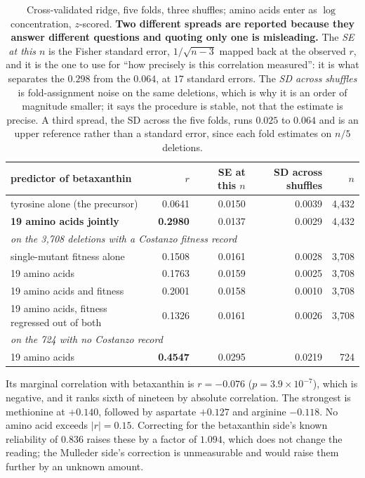 \begin{table}[htbp]
\centering\small
\begin{tabular}{lrrrr}
\toprule
predictor of betaxanthin & $r$ & SE at this $n$ & SD across shuffles & $n$ \\
\midrule
tyrosine alone (the precursor)         & 0.0641 & 0.0150 & 0.0039 & 4{,}432 \\
\textbf{19 amino acids jointly}        & \textbf{0.2980} & 0.0137 & 0.0029 & 4{,}432 \\
\midrule
\multicolumn{5}{l}{\emph{on the 3{,}708 deletions with a Costanzo fitness record}} \\
single-mutant fitness alone            & 0.1508 & 0.0161 & 0.0028 & 3{,}708 \\
19 amino acids                         & 0.1763 & 0.0159 & 0.0025 & 3{,}708 \\
19 amino acids and fitness             & 0.2001 & 0.0158 & 0.0010 & 3{,}708 \\
19 amino acids, fitness regressed out of both & 0.1326 & 0.0161 & 0.0026 & 3{,}708 \\
\midrule
\multicolumn{5}{l}{\emph{on the 724 with no Costanzo record}} \\
19 amino acids                         & \textbf{0.4547} & 0.0295 & 0.0219 & 724 \\
\bottomrule
\end{tabular}
\caption[]{Cross-validated ridge, five folds, three shuffles; amino acids enter as $\log$
concentration, $z$-scored. \textbf{Two different spreads are reported because they answer
different questions and quoting only one is misleading.} The \emph{SE at this $n$} is the
Fisher standard error, $1/\sqrt{n-3}$ mapped back at the observed $r$, and it is the one to
use for ``how precisely is this correlation measured'': it is what separates the $0.298$
from the $0.064$, at $17$ standard errors. The \emph{SD across shuffles} is fold-assignment
noise on the same deletions, which is why it is an order of magnitude smaller; it says the
procedure is stable, not that the estimate is precise. A third spread, the SD across the
five folds, runs $0.025$ to $0.064$ and is an upper reference rather than a standard error,
since each fold estimates on $n/5$ deletions.}
\label{tab:aa-predictivity}
\end{table}

 Its marginal correlation with betaxanthin is
$r = -0.076$ ($p = 3.9\times10^{-7}$), which is negative, and it ranks sixth of nineteen by
absolute correlation. The strongest is methionine at $+0.140$, followed by aspartate
$+0.127$ and arginine $-0.118$. No amino acid exceeds $|r| = 0.15$. Correcting for the
betaxanthin side's known reliability of $0.836$ raises these by a factor of $1.094$, which
does not change the reading; the Mulleder side's correction is unmeasurable and would raise
them further by an unknown amount.

